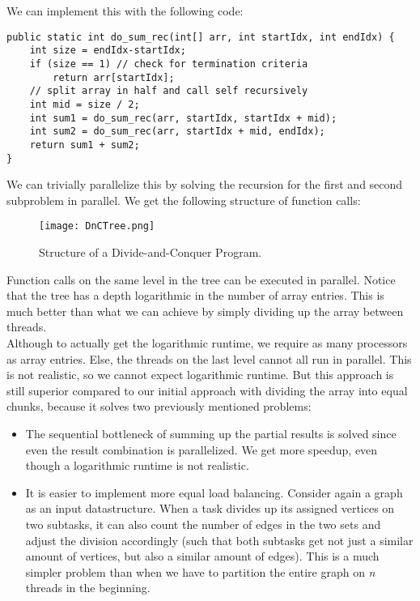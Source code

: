 \documentclass[main.tex]{subfiles}
\begin{document}
\noindent We can implement this with the following code:
\begin{verbatim}
public static int do_sum_rec(int[] arr, int startIdx, int endIdx) {
    int size = endIdx-startIdx;
    if (size == 1) // check for termination criteria
        return arr[startIdx];
    // split array in half and call self recursively
    int mid = size / 2;
    int sum1 = do_sum_rec(arr, startIdx, startIdx + mid);
    int sum2 = do_sum_rec(arr, startIdx + mid, endIdx);
    return sum1 + sum2;
}
\end{verbatim}
\noindent We can trivially parallelize this by solving the recursion for the first and second subproblem in parallel. We get the following structure of function calls:
\begin{figure}[H]
    \centering
    \texttt{[image: DnCTree.png]}
    \caption{Structure of a Divide-and-Conquer Program.}
\end{figure}
\noindent Function calls on the same level in the tree can be executed in parallel. Notice that the tree has a depth logarithmic in the number of array entries. This is much better than what we can achieve by simply dividing up the array between threads.\\
Although to actually get the logarithmic runtime, we require as many processors as array entries. Else, the threads on the last level cannot all run in parallel. This is not realistic, so we cannot expect logarithmic runtime. But this approach is still superior compared to our initial approach with dividing the array into equal chunks, because it solves two previously mentioned problems:
\begin{itemize}
  \item The sequential bottleneck of summing up the partial results is solved since even the result combination is parallelized. We get more speedup, even though a logarithmic runtime is not realistic.
  \item It is easier to implement more equal load balancing. Consider again a graph as an input datastructure. When a task divides up its assigned vertices on two subtasks, it can also count the number of edges in the two sets and adjust the division accordingly (such that both subtasks get not just a similar amount of vertices, but also a similar amount of edges). This is a much simpler problem than when we have to partition the entire graph on \textit{n} threads in the beginning.
\end{itemize}

\newpage
\end{document}
